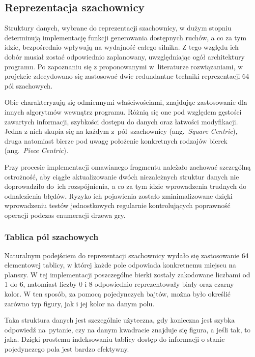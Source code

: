 \subsection{Reprezentacja szachownicy}
\label{subsec:reprezentacja-szachownicy}

Struktury danych, wybrane do reprezentacji szachownicy, w dużym stopniu determinują implementację funkcji generowania dostępnych ruchów, a co za tym idzie, bezpośrednio wpływają na wydajność całego silnika.
Z tego względu ich dobór musiał zostać odpowiednio zaplanowany, uwzględniając ogół architektury programu.
Po zapoznaniu się z proponowanymi w~literaturze rozwiązaniami, w projekcie zdecydowano się zastosować dwie redundantne techniki reprezentacji 64 pól szachowych.

Obie charakteryzują się odmiennymi właściwościami, znajdując zastosowanie dla innych algorytmów wewnątrz programu.
Różnią się one pod względem gęstości zawartych informacji, szybkości dostępu do danych oraz łatwości modyfikacji.
Jedna z nich skupia się na każdym z~pól~szachownicy (ang.~\emph{Square Centric}), druga natomiast bierze pod uwagę położenie konkretnych rodzajów bierek (ang.~\emph{Piece Centric}).

Przy procesie implementacji omawianego fragmentu należało zachować szczególną ostrożność, aby ciągłe aktualizowanie dwóch niezależnych struktur danych nie doprowadziło do~ich rozspójnienia, a co za tym idzie wprowadzenia trudnych do odnalezienia błędów.
Ryzyko ich pojawienia zostało zminimalizowane dzięki wprowadzeniu testów jednostkowych regularnie kontrolujących poprawność operacji podczas enumeracji drzewa gry.
\subsubsection{Tablica pól szachowych}

Naturalnym podejściem do reprezentacji szachownicy wydało się zastosowanie 64 elementowej tablicy, w której każde pole odpowiada konkretnemu miejscu na planszy.
W tej implementacji poszczególne bierki zostały zakodowane liczbami od 1 do 6, natomiast liczby 0 i 8 odpowiednio reprezentowały biały oraz czarny kolor.
W ten sposób, za pomocą pojedynczych bajtów, można było określić zarówno typ figury, jak i jej kolor na danym polu.

Taka struktura danych jest szczególnie użyteczna, gdy konieczna jest szybka odpowiedź na~pytanie, czy na danym kwadracie znajduje się figura, a jeśli tak, to jaka.
Dzięki prostemu indeksowaniu tablicy dostęp do informacji o stanie pojedynczego pola jest bardzo efektywny.

